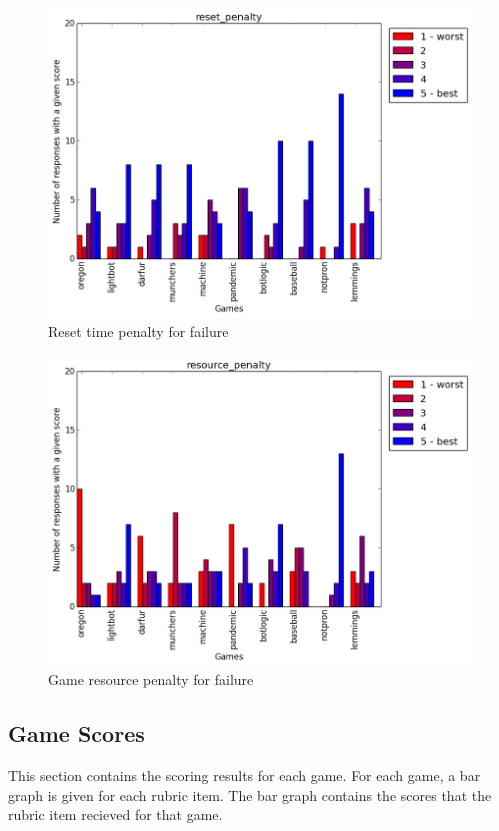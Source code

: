 			\begin{figure}[h] 
			\centering 
			\includegraphics[width=\textwidth]{reset_penalty_scores.png} 
			\caption{Reset time penalty for failure}
			\end{figure}

			\begin{figure}[h] 
			\centering 
			\includegraphics[width=\textwidth]{resource_penalty_scores.png} 
			\caption{Game resource penalty for failure}
			\end{figure}


\cleardoublepage
		\subsection{Game Scores}
			This section contains the scoring results for each game. For each game, a bar graph is given for each rubric item. The bar graph contains the scores that the rubric item recieved for that game.

